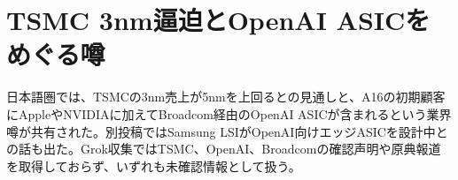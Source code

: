 \section{TSMC 3nm逼迫とOpenAI ASICをめぐる噂}
日本語圏では、TSMCの3nm売上が5nmを上回るとの見通しと、A16の初期顧客にAppleやNVIDIAに加えてBroadcom経由のOpenAI ASICが含まれるという業界噂が共有された。別投稿ではSamsung LSIがOpenAI向けエッジASICを設計中との話も出た。Grok収集ではTSMC、OpenAI、Broadcomの確認声明や原典報道を取得しておらず、いずれも未確認情報として扱う。
